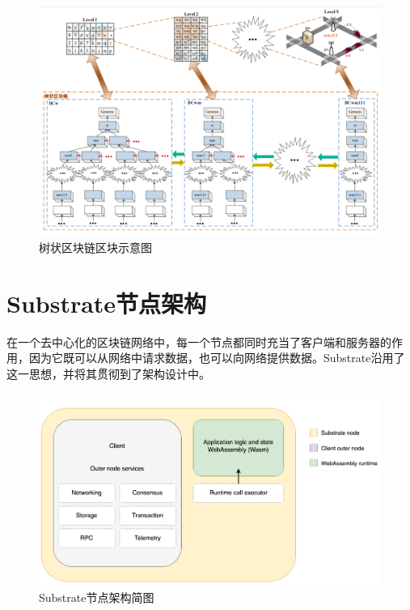   \begin{figure}[htbp]
    \centering
    \includegraphics[width=\textwidth]{images/树状链区块示意图.png}
    \caption{树状区块链区块示意图}\label{树状链区块示意图} %
  \end{figure}

\section{Substrate节点架构}

在一个去中心化的区块链网络中，每一个节点都同时充当了客户端和服务器的作用，因为它既可以从网络中请求数据，也可以向网络提供数据。Substrate沿用了这一思想，并将其贯彻到了架构设计中。

\begin{figure}[htbp]
    \centering
    \includegraphics[width=\textwidth]{images/simplified-architecture.png}
    \caption{Substrate节点架构简图}\label{Substrate节点架构简图} %
\end{figure}

